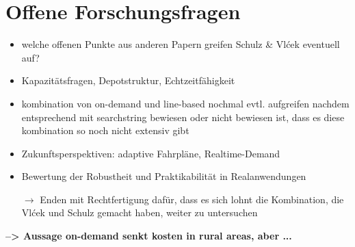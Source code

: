 \section{Offene Forschungsfragen}
\label{sec:2.3}
\label{sec:OffeneForschungsfragen}
\begin{itemize}
    \item welche offenen Punkte aus anderen Papern greifen Schulz \& Vlćek eventuell auf?
    \item Kapazitätsfragen, Depotstruktur, Echtzeitfähigkeit
    \item kombination von on-demand und line-based nochmal evtl. aufgreifen nachdem entsprechend mit searchstring bewiesen oder nicht bewiesen ist, dass es diese kombination so noch nicht extensiv gibt
    \item Zukunftsperspektiven: adaptive Fahrpläne, Realtime-Demand
    \item Bewertung der Robustheit und Praktikabilität in Realanwendungen
    
    $\rightarrow$ Enden mit Rechtfertigung dafür, dass es sich lohnt die Kombination, die Vlćek und Schulz gemacht haben, weiter zu untersuchen
\end{itemize}

\textbf{--> Aussage on-demand senkt kosten in rural areas, aber ...}

